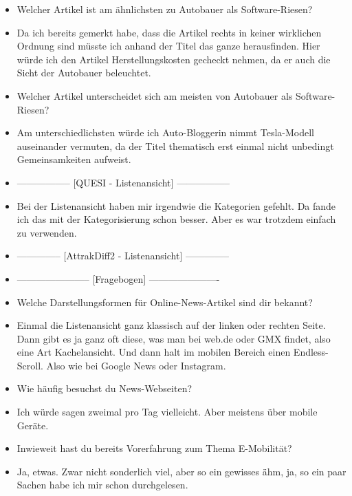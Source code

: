 {\begin{itemize}[]
            \item {} Welcher Artikel ist am ähnlichsten zu \flqq Autobauer als Software-Riesen\frqq{}?
            \item {} Da ich bereits gemerkt habe, dass die Artikel rechts in keiner wirklichen Ordnung sind müsste ich anhand der Titel das ganze herausfinden.
                  Hier würde ich den Artikel \flqq Herstellungskosten gecheckt\frqq{} nehmen, da er auch die Sicht der Autobauer beleuchtet.
            \item {} Welcher Artikel unterscheidet sich am meisten von \flqq Autobauer als Software-Riesen\frqq{}?
            \item {} Am unterschiedlichsten würde ich \flqq Auto-Bloggerin nimmt Tesla-Modell auseinander\frqq{} vermuten, da der Titel thematisch erst einmal nicht unbedingt Gemeinsamkeiten aufweist.
            \item {-----------------} [QUESI - Listenansicht] {-----------------}
            \item {} Bei der Listenansicht haben mir irgendwie die Kategorien gefehlt.
                  Da fande ich das mit der Kategorisierung schon besser.
                  Aber es war trotzdem einfach zu verwenden.
            \item {--------------} [AttrakDiff2 - Listenansicht] {--------------}
            \item {-----------------------} [Fragebogen] {----------------------}
            \item {} Welche Darstellungsformen für Online-News-Artikel sind dir bekannt?
            \item {} Einmal die Listenansicht ganz klassisch auf der linken oder rechten Seite.
                  Dann gibt es ja ganz oft diese, was man bei web.de oder GMX findet, also eine Art Kachelansicht.
                  Und dann halt im mobilen Bereich einen Endless-Scroll.
                  Also wie bei Google News oder Instagram.
            \item {} Wie häufig besuchst du News-Webseiten?
            \item {} Ich würde sagen zweimal pro Tag vielleicht. Aber meistens über mobile Geräte.
            \item {} Inwieweit hast du bereits Vorerfahrung zum Thema E-Mobilität?
            \item {} Ja, etwas. Zwar nicht sonderlich viel, aber so ein gewisses ähm, ja, so ein paar Sachen habe ich mir schon durchgelesen.

\end{itemize}}
